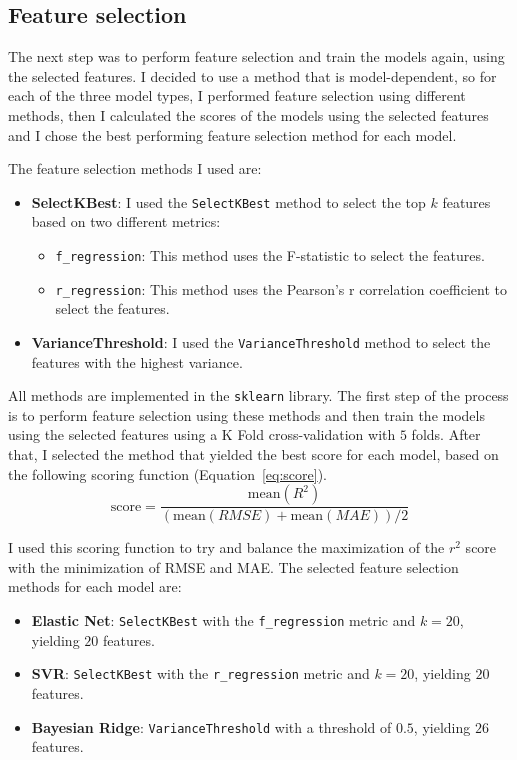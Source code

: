 \documentclass[12pt]{article}
\begin{document}
\subsection{Feature selection}
The next step was to perform feature selection and train the models again, using the
selected features. I decided to use a method that is model-dependent, so for each
of the three model types, I performed feature selection using different methods, then
I calculated the scores of the models using the selected features and I chose the
best performing feature selection method for each model.

The feature selection methods I used are:
\begin{itemize}
    \item \textbf{SelectKBest}: I used the \texttt{SelectKBest} method to select the
    top $k$ features based on two different metrics:
    \begin{itemize}
        \item \texttt{f\_regression}: This method uses the F-statistic to select
        the features.
        \item \texttt{r\_regression}: This method uses the Pearson's r
        correlation coefficient to select the features.
    \end{itemize}
    \item \textbf{VarianceThreshold}: I used the \texttt{VarianceThreshold} method
    to select the features with the highest variance.
\end{itemize}

All methods are implemented in the \texttt{sklearn} library. The first step of the
process is to perform feature selection using these methods and then train the
models using the selected features using a K Fold cross-validation with $5$ folds.
After that, I selected the method that yielded the best score for each model, based
on the following scoring function (Equation~\ref{eq:score}).
\begin{equation}    
\text{score} = \frac{
    \text{mean}(R^2)
    }{
    (\text{mean}(RMSE) + \text{mean}(MAE)) / 2
    }
    \label{eq:score}
\end{equation}

I used this scoring function to try and balance the maximization of the $r^2$ score
with the minimization of RMSE and MAE. The selected feature selection methods for
each model are:
\begin{itemize}
    \item \textbf{Elastic Net}: \texttt{SelectKBest} with the \texttt{f\_regression}
    metric and $k=20$, yielding $20$ features.
    \item \textbf{SVR}: \texttt{SelectKBest} with the \texttt{r\_regression} metric
    and $k=20$, yielding $20$ features.
    \item \textbf{Bayesian Ridge}: \texttt{VarianceThreshold} with a threshold of
    $0.5$, yielding $26$ features.
\end{itemize}
\end{document}
